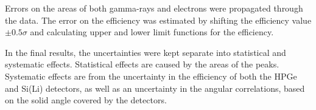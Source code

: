 Errors on the areas of both gamma-rays and electrons were propagated through the data. The error on the efficiency was estimated by shifting the efficiency value $\pm0.5\sigma$ and calculating upper and lower limit functions for the efficiency. 

In the final results, the uncertainties were kept separate into statistical and systematic effects. Statistical effects are caused by the areas of the peaks. Systematic effects are from the uncertainty in the efficiency of both the HPGe and Si(Li) detectors, as well as an uncertainty in the angular correlations, based on the solid angle covered by the detectors.